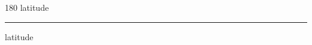 
\begin{frame}
\begin{center}
\begin{turn}{180}
{\fontsize{2.5cm}{1em}\selectfont latitude}
\end{turn}
\vspace{1em}\par  
\hrule
\vspace{1em}\par  
{\fontsize{2.5cm}{1em}\selectfont latitude}
\end{center}
\end{frame}
